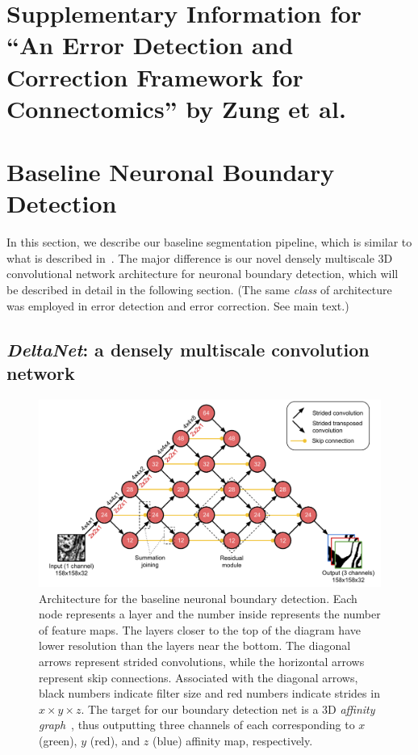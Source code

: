 \documentclass{article}
\begin{document}
\section*{Supplementary Information for ``An Error Detection and Correction Framework for Connectomics'' by Zung et al.}

\appendix
\section{Baseline Neuronal Boundary Detection}
\label{appendix:baseline}

In this section, we describe our baseline segmentation pipeline, which is
similar to what is described in~\cite{kisuk}. The major difference is our novel
densely multiscale 3D convolutional network architecture for neuronal boundary
detection, which will be described in detail in the following section. (The same
\emph{class} of architecture was employed in error detection and error
correction. See main text.)

\subsection{\textsl{DeltaNet}: a densely multiscale convolution network}
\label{sec:deltanet}

\begin{figure}[!b]
\centering
\includegraphics[width=1.0\linewidth]{baseline.pdf}

\caption{Architecture for the baseline neuronal boundary detection. Each node
represents a layer and the number inside represents the number of feature maps.
The layers closer to the top of the diagram have lower resolution than the
layers near the bottom. The diagonal arrows represent strided convolutions,
while the horizontal arrows represent skip connections. Associated with the
diagonal arrows, black numbers indicate filter size and red numbers indicate
strides in $x\times y\times z$. The target for our boundary detection net is a
3D \emph{affinity graph}~\cite{boundary_detection,kisuk,funke2017deep}, thus
outputting three channels of each corresponding to $x$ (green), $y$ (red), and
$z$ (blue) affinity map, respectively.}

\label{fig:boundary_detector}
\end{figure}
\end{document}
